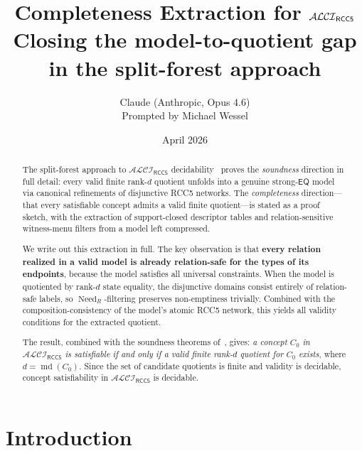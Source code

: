 \documentclass[11pt]{article}
\title{\textbf{Completeness Extraction for $\ALCIRCC{5}$}\\[0.4em]
\large Closing the model-to-quotient gap in the split-forest approach}
\author{Claude (Anthropic, Opus 4.6)\\
\small Prompted by Michael Wessel}
\date{April 2026}
\theoremstyle{definition}
\theoremstyle{remark}
\newcommand{\EQ}{\mathsf{EQ}}
\newcommand{\md}{\operatorname{md}}
\newcommand{\Need}{\operatorname{Need}}
\newcommand{\ALCIRCC}[1]{\mathcal{ALCI}_{\mathsf{RCC#1}}}
\begin{document}
\maketitle

\begin{center}
\end{center}

\begin{abstract}
The split-forest approach to $\ALCIRCC{5}$ decidability~\cite{SplitForest}
proves the \emph{soundness} direction in full detail: every valid finite
rank-$d$ quotient unfolds into a genuine strong-$\EQ$ model via canonical
refinements of disjunctive RCC5 networks.  The \emph{completeness}
direction---that every satisfiable concept admits a valid finite
quotient---is stated as a proof sketch, with the extraction of
support-closed descriptor tables and relation-sensitive witness-menu
filters from a model left compressed.

We write out this extraction in full.  The key observation is that
\textbf{every relation realized in a valid model is already
relation-safe for the types of its endpoints}, because the model
satisfies all universal constraints.  When the model is quotiented by
rank-$d$ state equality, the disjunctive domains consist entirely of
relation-safe labels, so $\Need_R$-filtering preserves non-emptiness
trivially.  Combined with the composition-consistency of the model's
atomic RCC5 network, this yields all validity conditions for the
extracted quotient.

The result, combined with the soundness theorems
of~\cite{SplitForest}, gives: \emph{a concept $C_0$ in $\ALCIRCC{5}$
is satisfiable if and only if a valid finite rank-$d$ quotient for
$C_0$ exists}, where $d=\md(C_0)$.  Since the set of candidate
quotients is finite and validity is decidable, concept satisfiability
in $\ALCIRCC{5}$ is decidable.
\end{abstract}


\section{Introduction}
\label{sec:intro}
\end{document}
